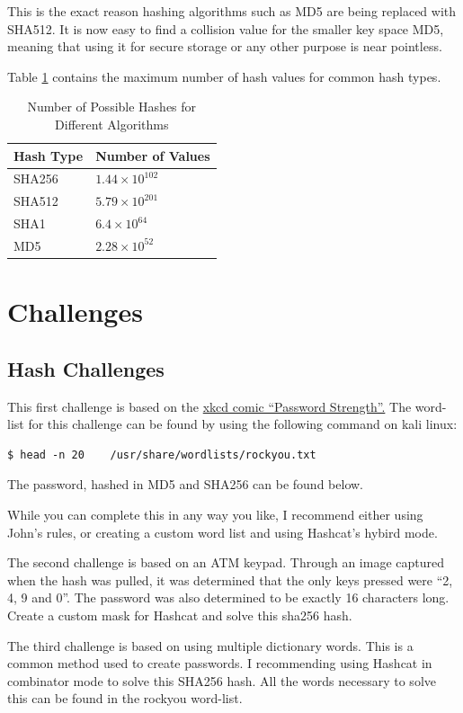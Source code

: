 			This is the exact reason hashing algorithms such as MD5 are being replaced with SHA512. 
			It is now easy to find a collision value for the smaller key space MD5, meaning that using it for secure storage or any other purpose is near pointless. 

			Table \ref{tab:HashCollisions} contains the maximum number of hash values for common hash types.
			\begin{table}[htb]
				\centering
				\begin{adjustbox}{max width=1\textwidth}
				\begin{tabular}{| l | l |}
					\hline
					\textbf{Hash Type} & \textbf{Number of Values} \\ \hline
					SHA256 & $1.44\times10^{102}$ \\ \hline
					SHA512 & $5.79\times10^{201}$ \\ \hline
					SHA1   & $6.4\times10^{64}$ \\ \hline
					MD5	   & $2.28\times10^{52}$ \\ \hline
				\end{tabular}
			\end{adjustbox}
				\label{tab:HashCollisions}
				\caption{Number of Possible Hashes for Different Algorithms}
			\end{table} 
	\section{Challenges}
		\subsection{Hash Challenges}
			This first challenge is based on the \href{https://xkcd.com/936/}{xkcd comic ``Password Strength''.}
			The word-list for this challenge can be found by using the following command on kali linux:
			\begin{lstlisting}[style=CLI]
				$ head -n 20	/usr/share/wordlists/rockyou.txt
			\end{lstlisting}
			The password, hashed in MD5 and SHA256 can be found below. 
			
			While you can complete this in any way you like, I recommend either using John's rules, or creating a custom word list and using Hashcat's hybird mode. 

			The second challenge is based on an ATM keypad. 
			Through an image captured when the hash was pulled, it was determined that the only keys pressed were ``2, 4, 9 and 0''. 
			The password was also determined to be exactly 16 characters long. 
			Create a custom mask for Hashcat and solve this sha256 hash. 
			

			The third challenge is based on using multiple dictionary words. 
			This is a common method used to create passwords. 
			I recommending using Hashcat in combinator mode to solve this SHA256 hash. 
			All the words necessary to solve this can be found in the rockyou word-list. 
			
